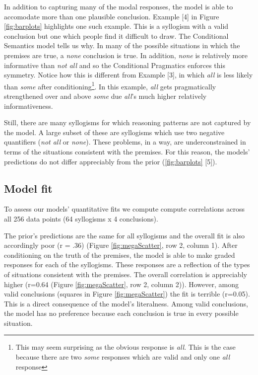 \documentclass[10pt,letterpaper]{article}
\begin{document}
In addition to capturing many of the modal responses, the model is able to accomodate more than one plausible conclusion. Example [4] in Figure \ref{fig:barplots} highlights one such example. This is a syllogism with a valid conclusion but one which people find it difficult to draw. The Conditional Semantics model tells us why. In many of the possible situations in which the premises are true, a \emph{none} conclusion is true. In addition, \emph{none} is relatively more informative than \emph{not all} and so the Conditional Pragmatics enforces this symmetry. Notice how this is different from Example [3], in which \emph{all} is less likely than  \emph{some} after conditioning\footnote{This may seem surprising as the obvious response is \emph{all}. This is the case because there are two \emph{some} responses which are valid and only one \emph{all} response}. In this example, \emph{all} gets pragmatically strengthened over and above \emph{some} due \emph{all}'s much higher relatively informativeness.  

Still, there are many syllogisms for which reasoning patterns are not captured by the model. A large subset of these are syllogisms which use two negative quantifiers (\emph{not all} or \emph{none}). These problems, in a way, are underconstrained in terms of the situations consistent with the premises. For this reason, the models' predictions do not differ appreciably from the prior (\ref{fig:barplots} [5]).

\subsection{Model fit}

To assess our models' quantitative fits we compute compute correlations across all 256 data points (64 syllogisms x 4 conclusions).

The prior's predictions are the same for all syllogisms and the overall fit is also accordingly poor (r = .36) (Figure \ref{fig:megaScatter}, row 2, column 1).  After conditioning on the truth of the premises, the model is able to make graded responses for each of the syllogisms. These responses are a reflection of the types of situations consistent with the premises. The overall correlation is appreciably higher (r=0.64 (Figure \ref{fig:megaScatter}, row 2, column 2)). However, among valid conclusions (squares in Figure \ref{fig:megaScatter}) the fit is terrible (r=0.05). This is a direct consequence of the model's literalness. Among valid conclusions, the model has no preference because each conclusion is true in every possible situation.
\end{document}
